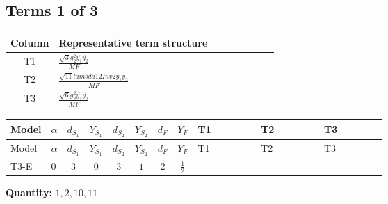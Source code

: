 \documentclass[8pt]{article}
\begin{document}
\begin{landscape}
\subsection*{Terms 1 of 3}
\begin{center}
\begin{tabular}{@{}c >{\raggedright\arraybackslash}p{0.82\linewidth}@{}}
\toprule
Column & Representative term structure \\
\midrule
T1 & \(\displaystyle \frac{\sqrt{3} g_{2}^{2} \overline{y_{1}} \overline{y_{2}}}{MF}\) \\
\midrule
T2 & \(\displaystyle \frac{\sqrt{11} lambda12Inv2 \overline{y_{1}} \overline{y_{2}}}{MF}\) \\
\midrule
T3 & \(\displaystyle \frac{\sqrt{6} g_{2}^{2} \overline{y_{1}} \overline{y_{2}}}{MF}\) \\
\midrule
\bottomrule
\end{tabular}
\end{center}
\smallskip
\tiny
\begin{longtable}{@{}llcccccc >{\raggedright\arraybackslash}p{0.21\linewidth} >{\raggedright\arraybackslash}p{0.21\linewidth} >{\raggedright\arraybackslash}p{0.21\linewidth}@{}}
\toprule
Model & $\alpha$ & $d_{S_1}$ & $Y_{S_1}$ & $d_{S_2}$ & $Y_{S_2}$ & $d_F$ & $Y_F$ & T1 & T2 & T3 \\
\midrule
\endfirsthead
\toprule
Model & $\alpha$ & $d_{S_1}$ & $Y_{S_1}$ & $d_{S_2}$ & $Y_{S_2}$ & $d_F$ & $Y_F$ & T1 & T2 & T3 \\
\midrule
\endhead
T3-E & $0$ & $3$ & $0$ & $3$ & $1$ & $2$ & $\frac{1}{2}$ & \scriptsize\adjustbox{max width=\linewidth}{$\begin{gathered} - \frac{15 \sqrt{3} g_{2}^{2} \overline{y_{1}} \overline{y_{2}}}{8 MF}\end{gathered}$} & \scriptsize\adjustbox{max width=\linewidth}{$\begin{gathered} - \frac{3 \sqrt{11} lambda12Inv2 \overline{y_{1}} \overline{y_{2}}}{22 MF}\end{gathered}$} & \scriptsize\adjustbox{max width=\linewidth}{$\begin{gathered} - \frac{\sqrt{6} g_{2}^{2} \overline{y_{1}} \overline{y_{2}}}{6 MF}\end{gathered}$} \\
\midrule
\bottomrule
\end{longtable}
\clearpage
\noindent\textbf{Quantity: }$\mathrm{1,2,10,11}$\par\smallskip

\end{landscape}
\end{document}
